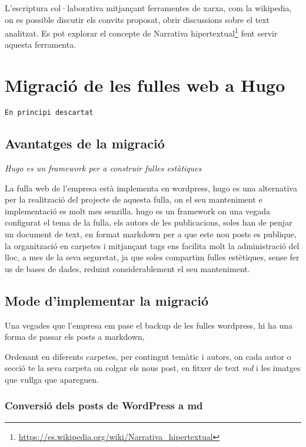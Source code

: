 \documentclass[
  10pt, krantz2,
]{krantz}
\DeclareRobustCommand{\href}[2]{#2\footnote{\url{#1}}}
\renewcommand{\href}[2]{#2\footnote{\url{#1}}}
\begin{document}
L'escriptura col·laborativa mitjançant ferramentes de xarxa, com la wikipedia, on es possible discutir els convits proposat, obrir discussions sobre el text analitzat. Es pot explorar el concepte de \href{https://es.wikipedia.org/wiki/Narrativa_hipertextual}{Narrativa hipertextual} fent servir aquesta ferramenta.

\hypertarget{migraciuxf3-de-les-fulles-web-a-hugo}{%
\chapter{Migració de les fulles web a Hugo}\label{migraciuxf3-de-les-fulles-web-a-hugo}}

\texttt{En\ principi\ descartat}

\hypertarget{avantatges-de-la-migraciuxf3}{%
\section{Avantatges de la migració}\label{avantatges-de-la-migraciuxf3}}

\emph{Hugo es un framework per a construir fulles estàtiques}

La fulla web de l'empresa està implementa en wordpress, hugo es una alternativa per la realització del projecte de aquesta fulla, on el seu manteniment e implementació es molt mes senzilla. hugo es un framework on una vegada configurat el tema de la fulla, els autors de les publicacions, soles han de penjar un document de text, en format markdown per a que este nou posts es publique, la organització en carpetes i mitjançant tags ens facilita molt la administració del lloc, a mes de la seva seguretat, ja que soles compartim fulles estètiques, sense fer us de bases de dades, reduint considerablement el seu manteniment.

\hypertarget{mode-dimplementar-la-migraciuxf3}{%
\section{Mode d'implementar la migració}\label{mode-dimplementar-la-migraciuxf3}}

Una vegades que l'empresa em pase el backup de les fulles wordpress, hi ha una forma de passar els posts a markdown,

Ordenant en diferents carpetes, per contingut temàtic i autors, on cada autor o secció te la seva carpeta on colgar els nous post, en fitxer de text \emph{md} i les imatges que vullga que apareguen.

\hypertarget{conversiuxf3-dels-posts-de-wordpress-a-md}{%
\subsection{Conversió dels posts de WordPress a md}\label{conversiuxf3-dels-posts-de-wordpress-a-md}}
\end{document}
